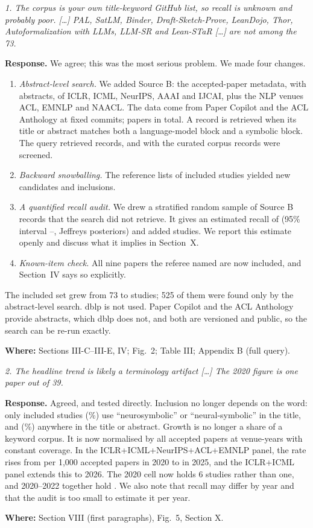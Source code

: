 \documentclass[10pt,a4paper]{article}
\newenvironment{referee}{\par\medskip\noindent\begin{minipage}{\linewidth}\color{black!65}\itshape}{\end{minipage}\par\smallskip}
\newcommand{\resp}{\noindent\textbf{Response.} }
\newcommand{\where}[1]{\par\noindent\textbf{Where:} #1\par}
\begin{document}
\begin{referee}
1. The corpus is your own title-keyword GitHub list, so recall is unknown and probably poor. [\ldots] PAL, SatLM, Binder, Draft-Sketch-Prove, LeanDojo, Thor, Autoformalization with LLMs, LLM-SR and Lean-STaR [\ldots] are not among the 73.
\end{referee}
\resp We agree; this was the most serious problem. We made four changes.
\begin{enumerate}
  \item \emph{Abstract-level search.} We added Source B: the accepted-paper metadata, with abstracts, of ICLR, ICML, NeurIPS, AAAI and IJCAI, plus the NLP venues ACL, EMNLP and NAACL. The data come from Paper Copilot and the ACL Anthology at fixed commits;  papers in total. A record is retrieved when its title or abstract matches both a language-model block and a symbolic block. The query retrieved  records, and with the curated corpus  records were screened.
  \item \emph{Backward snowballing.} The reference lists of  included studies yielded  new candidates and  inclusions.
  \item \emph{A quantified recall audit.} We drew a stratified random sample of  Source B records that the search did not retrieve. It gives an estimated recall of  (95\% interval --, Jeffreys posteriors) and added  studies. We report this estimate openly and discuss what it implies in Section~X.
  \item \emph{Known-item check.} All nine papers the referee named are now included, and Section~IV says so explicitly.
\end{enumerate}
The included set grew from 73 to  studies; 525 of them were found only by the abstract-level search. dblp is not used. Paper Copilot and the ACL Anthology provide abstracts, which dblp does not, and both are versioned and public, so the search can be re-run exactly.
\where{Sections III-C--III-E, IV; Fig.~2; Table III; Appendix B (full query).}

\begin{referee}
2. The headline trend is likely a terminology artifact [\ldots] The 2020 figure is one paper out of 39.
\end{referee}
\resp Agreed, and tested directly. Inclusion no longer depends on the word: only  included studies (\%) use ``neurosymbolic'' or ``neural-symbolic'' in the title, and  (\%) anywhere in the title or abstract. Growth is no longer a share of a keyword corpus. It is now normalised by all accepted papers at venue-years with constant coverage. In the ICLR+ICML+NeurIPS+ACL+EMNLP panel, the rate rises from  per 1{,}000 accepted papers in 2020 to  in 2025, and the ICLR+ICML panel extends this to 2026. The 2020 cell now holds 6 studies rather than one, and 2020--2022 together hold . We also note that recall may differ by year and that the audit is too small to estimate it per year.
\where{Section VIII (first paragraphs), Fig.~5, Section X.}
\end{document}
